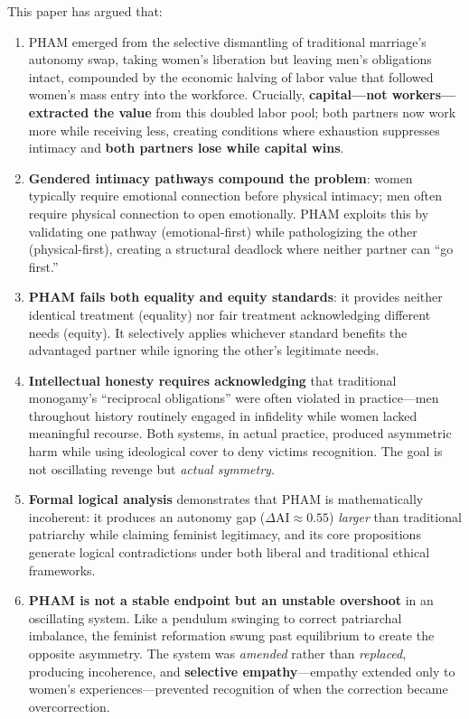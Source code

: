 \documentclass[12pt, letterpaper]{article}
\begin{document}
This paper has argued that:

\begin{enumerate}
    \item PHAM emerged from the selective dismantling of traditional marriage's autonomy swap, taking women's liberation but leaving men's obligations intact, compounded by the economic halving of labor value that followed women's mass entry into the workforce. Crucially, \textbf{capital---not workers---extracted the value} from this doubled labor pool; both partners now work more while receiving less, creating conditions where exhaustion suppresses intimacy and \textbf{both partners lose while capital wins}.
    
    \item \textbf{Gendered intimacy pathways compound the problem}: women typically require emotional connection before physical intimacy; men often require physical connection to open emotionally. PHAM exploits this by validating one pathway (emotional-first) while pathologizing the other (physical-first), creating a structural deadlock where neither partner can ``go first.''
    
    \item \textbf{PHAM fails both equality and equity standards}: it provides neither identical treatment (equality) nor fair treatment acknowledging different needs (equity). It selectively applies whichever standard benefits the advantaged partner while ignoring the other's legitimate needs.
    
    \item \textbf{Intellectual honesty requires acknowledging} that traditional monogamy's ``reciprocal obligations'' were often violated in practice---men throughout history routinely engaged in infidelity while women lacked meaningful recourse. Both systems, in actual practice, produced asymmetric harm while using ideological cover to deny victims recognition. The goal is not oscillating revenge but \textit{actual symmetry}.
    
    \item \textbf{Formal logical analysis} demonstrates that PHAM is mathematically incoherent: it produces an autonomy gap ($\Delta \text{AI} \approx 0.55$) \textit{larger} than traditional patriarchy while claiming feminist legitimacy, and its core propositions generate logical contradictions under both liberal and traditional ethical frameworks.
    
    \item \textbf{PHAM is not a stable endpoint but an unstable overshoot} in an oscillating system. Like a pendulum swinging to correct patriarchal imbalance, the feminist reformation swung past equilibrium to create the opposite asymmetry. The system was \textit{amended} rather than \textit{replaced}, producing incoherence, and \textbf{selective empathy}---empathy extended only to women's experiences---prevented recognition of when the correction became overcorrection.
    

\end{enumerate}
\end{document}
